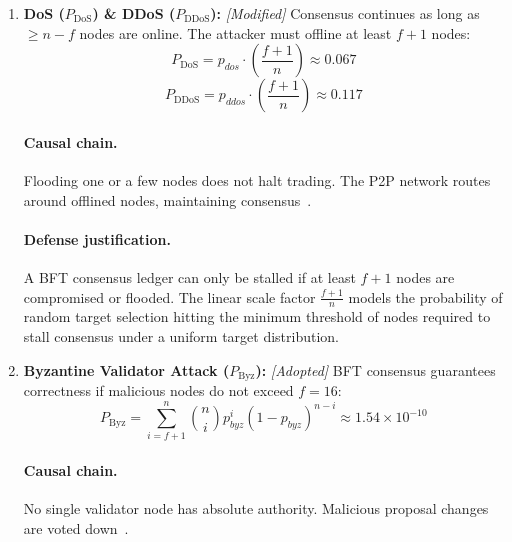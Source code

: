 \documentclass[10pt,twocolumn,journal]{IEEEtran}
\begin{document}
\begin{enumerate}[leftmargin=*]
    \paragraph{Causal chain.} Because the validator pool is permissioned, the attacker cannot spin up arbitrary node identities. They must hack existing validator nodes~\cite{li2020_blockchain}.

    \item \textbf{DoS ($P_{\mathrm{DoS}}$) \& DDoS ($P_{\mathrm{DDoS}}$):} \emph{[Modified]} Consensus continues as long as $\geq n - f$ nodes are online. The attacker must offline at least $f+1$ nodes:
    \begin{equation}
    \label{eq:dos_bc}
    P_{\mathrm{DoS}} = p_{dos} \cdot \left(\frac{f+1}{n}\right) \approx 0.067
    \end{equation}
    \begin{equation}
    \label{eq:ddos_bc}
    P_{\mathrm{DDoS}} = p_{ddos} \cdot \left(\frac{f+1}{n}\right) \approx 0.117
    \end{equation}
    \paragraph{Causal chain.} Flooding one or a few nodes does not halt trading. The P2P network routes around offlined nodes, maintaining consensus~\cite{wang2013}.
    \paragraph{Defense justification.} A BFT consensus ledger can only be stalled if at least $f+1$ nodes are compromised or flooded. The linear scale factor $\frac{f+1}{n}$ models the probability of random target selection hitting the minimum threshold of nodes required to stall consensus under a uniform target distribution.

    \item \textbf{Byzantine Validator Attack ($P_{\mathrm{Byz}}$):} \emph{[Adopted]} BFT consensus guarantees correctness if malicious nodes do not exceed $f=16$:
    \begin{equation}
    \label{eq:byz_bc}
    P_{\mathrm{Byz}} = \sum_{i=f+1}^{n} \binom{n}{i} p_{byz}^i (1 - p_{byz})^{n-i} \approx 1.54 \times 10^{-10}
    \end{equation}
    \paragraph{Causal chain.} No single validator node has absolute authority. Malicious proposal changes are voted down~\cite{castro1999}.


\end{enumerate}
\end{document}
